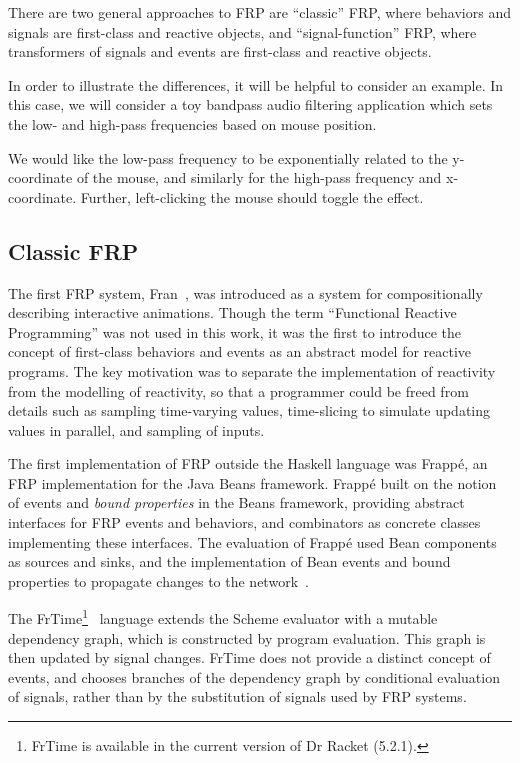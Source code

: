 There are two general approaches to FRP are ``classic'' FRP, where behaviors and signals are first-class and reactive objects, and ``signal-function'' FRP,
where transformers of signals and events are first-class and reactive objects.

In order to illustrate the differences, it will be helpful to consider an example. In this case, we will consider
a toy bandpass audio filtering application which sets the low- and high-pass frequencies based on mouse position.

We would like the low-pass frequency to be exponentially related to the y-coordinate of the mouse, and similarly for the
high-pass frequency and x-coordinate. Further, left-clicking the mouse should toggle the effect.

\subsection{Classic FRP}
\label{subsection:classic_frp}

The first FRP system, Fran~\cite{Elliott1997}, was introduced as a system for compositionally describing interactive animations.
Though the term ``Functional Reactive Programming'' was not used in this work, it was the first to introduce the concept of first-class
behaviors and events as an abstract model for reactive programs. The key motivation was to separate the implementation of reactivity
from the modelling of reactivity, so that a programmer could be freed from details such as sampling time-varying values, time-slicing
to simulate updating values in parallel, and sampling of inputs.

The first implementation of FRP outside the Haskell language was Frapp\'{e}, an FRP implementation for the Java Beans framework. Frapp\'{e} built on
the notion of events and {\em bound properties} in the Beans framework, providing abstract interfaces for FRP events and behaviors, and combinators
as concrete classes implementing these interfaces. The evaluation of Frapp\'{e} used Bean components as sources and sinks, and the implementation of
Bean events and bound properties to propagate changes to the network~\cite{Courtney2001-2}.


The FrTime\footnote{FrTime is available in the current version of Dr Racket (5.2.1).}~\cite{Cooper2006} language extends the Scheme evaluator with a mutable
dependency graph, which is constructed by program evaluation. This graph is then updated by signal changes. FrTime does not provide a distinct concept of
events, and chooses branches of the dependency graph by conditional evaluation of signals, rather than by the substitution of signals used by FRP systems.

